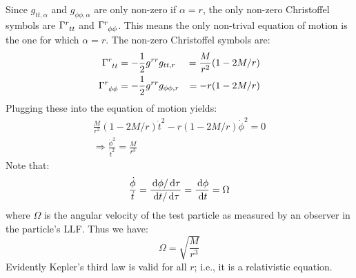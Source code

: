 Since $g_{tt,\alpha}$ and $g_{\phi\phi,\alpha}$ are only non-zero if $\alpha = r$, the only non-zero Christoffel symbols are $\Gamma\indices{^r_{tt}}$ and $\Gamma\indices{^r_{\phi\phi}}$. This means the only non-trival equation of motion is the one for which $\alpha = r$. The non-zero Christoffel symbols are:
\begin{subequations}
\begin{align}
\Gamma\indices{^r_{tt}} &= -\frac{1}{2} g^{rr}g_{tt,r} &= \frac{M}{r^2}(1 - 2M/r) \\
\Gamma\indices{^r_{\phi\phi}} &= -\frac{1}{2} g^{rr}g_{\phi\phi,r} &= -r(1-2M/r)
\end{align}
\end{subequations}
Plugging these into the equation of motion yields:
\begin{align*}
\frac{M}{r^2}(1 - 2M/r)\dot{t}^2 - r(1-2M/r)\dot{\phi}^2 = 0 \\
\Rightarrow \frac{\dot{\phi}^2}{\dot{t}^2} = \frac{M}{r^3}
\end{align*}
Note that:
\begin{equation}
\frac{\dot{\phi}}{\dot{t}} = \frac{\,\mathrm{d}\phi/\,\mathrm{d}\tau}{\,\mathrm{d} t/\,\mathrm{d}\tau} = \frac{\,\mathrm{d}\phi}{\,\mathrm{d} t} = \Omega
\end{equation}
where $\Omega$ is the angular velocity of the test particle as measured by an observer in the particle's \ac{LLF}. Thus we have:
\begin{equation}
\Omega = \sqrt{\frac{M}{r^3}}
\end{equation}
Evidently Kepler's third law is valid for all $r$; i.e., it is a relativistic equation. 

